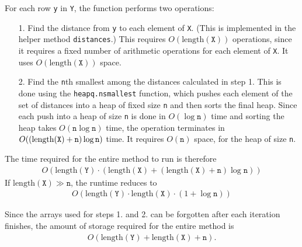 \documentclass{amsart}
\theoremstyle{definition}
\theoremstyle{definition}
\begin{document}
For each row \texttt{y} in \texttt{Y}, the function performs two operations:
\begin{itemize}
\item[1.] Find the distance from \texttt{y} to each element of \texttt{X}.  (This is implemented in the helper method \texttt{distances}.)  This requires $O(\mbox{length}(\texttt{X}))$ operations, since it requires a fixed number of arithmetic operations for each element of \texttt{X}.  It uses $O(\mbox{length}(\texttt{X}))$ space.
\item[2.] Find the \texttt{n}th smallest among the distances calculated in step 1.  This is done using the \texttt{heapq.nsmallest} function, which pushes each element of the set of distances into a heap of fixed size \texttt{n} and then sorts the final heap.  Since each push into a heap of size \texttt{n} is done in $O(\log \texttt{n})$ time and sorting the heap takes $O(\texttt{n}\log \texttt{n})$ time, the operation terminates in $O((\mbox{length(\texttt{X})}+\texttt{n})\log \texttt{n})$ time.  It requires $O(\texttt{n})$ space, for the heap of size \texttt{n}.
\end{itemize}
The time required for the entire method to run is therefore
\begin{align*}
  O(\mbox{length}(\texttt{Y})\cdot (\mbox{length}(\texttt{X}) + (\mbox{length}(\texttt{X})+\texttt{n})\log \texttt{n}))
\end{align*}
If $\mbox{length}(\texttt{X}) \gg \texttt{n}$, the runtime reduces to
\begin{align}
  O(\mbox{length}(\texttt{Y})\cdot \mbox{length}(\texttt{X}) \cdot (1+\log \texttt{n}))\label{performance}
\end{align}

Since the arrays used for steps 1. and 2. can be forgotten after each iteration finishes, the amount of storage required for the entire method is
\begin{align}
  O(\mbox{length}(\texttt{Y}) + \mbox{length}(\texttt{X}) + \texttt{n}). \label{storage}
\end{align}
\end{document}
